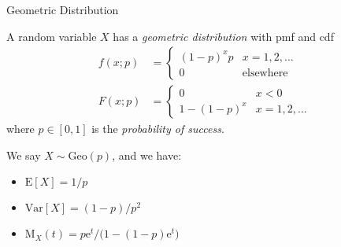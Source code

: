 \documentclass[8pt, handout]{beamer}
\renewcommand{\emph}[1]{\textcolor{defcol}{\textsl{#1}}}
\begin{document}
\begin{frame}{Geometric Distribution}

    A random variable \(X\) has a \emph{geometric distribution} with pmf and cdf
    \begin{align*}
        f(x;p) &= \begin{cases}
            (1 - p)^x p & x = 1, 2, \ldots \\
            0 & \text{elsewhere}
        \end{cases} \\[2em]
        F(x;p) &= \begin{cases}
            0 & x < 0 \\
            1 - (1 - p)^x & x = 1, 2, \ldots
        \end{cases}
    \end{align*}
    where \(p \in [0,1]\) is the \emph{probability of success}.

    \vspace{2em}
    We say \(X \sim \mathrm{Geo}(p)\), and we have:
    \begin{itemize}
        \item \(\mathrm{E}[X] = 1/p\)
        \item \(\mathrm{Var}[X] = (1 - p)/p^2\)
        \item \(\mathrm{M}_X(t) = p \mathrm{e}^t / \Big( 1 - (1 - p)\mathrm{e}^t \Big)\)
    \end{itemize}

\end{frame}
\end{document}
